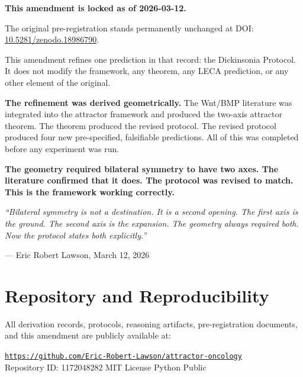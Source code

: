 \documentclass[12pt, a4paper]{article}
\theoremstyle{definition}
\theoremstyle{remark}
\begin{document}
\begin{center}
\colorbox{warnbox}{
\begin{minipage}{0.88\textwidth}
\vspace{0.6em}
\textbf{This amendment is locked as of 2026-03-12.}

\medskip
The original pre-registration stands permanently
unchanged at DOI:
\href{https://doi.org/10.5281/zenodo.18986790}
{10.5281/zenodo.18986790}.

\medskip
This amendment refines one prediction in that record:
the Dickinsonia Protocol. It does not modify the
framework, any theorem, any LECA prediction, or any
other element of the original.

\medskip
\textbf{The refinement was derived geometrically.}
The Wnt/BMP literature was integrated into the attractor
framework and produced the two-axis attractor theorem.
The theorem produced the revised protocol. The revised
protocol produced four new pre-specified, falsifiable
predictions. All of this was completed before any
experiment was run.

\medskip
\textbf{The geometry required bilateral symmetry to have
two axes. The literature confirmed that it does. The
protocol was revised to match. This is the framework
working correctly.}

\medskip
\textit{``Bilateral symmetry is not a destination. It is
a second opening. The first axis is the ground.
The second axis is the expansion.
The geometry always required both.
Now the protocol states both explicitly.''}

\vspace{0.4em}
\hfill --- Eric Robert Lawson, March 12, 2026
\vspace{0.4em}
\end{minipage}
}
\end{center}

\section*{Repository and Reproducibility}

All derivation records, protocols, reasoning artifacts,
pre-registration documents, and this amendment are
publicly available at:

\begin{center}
\href{https://github.com/Eric-Robert-Lawson/attractor-oncology}
{\texttt{https://github.com/Eric-Robert-Lawson/attractor-oncology}}
\\[0.3em]
\small Repository ID: 1172048282 \textbar{}
MIT License \textbar{} Python \textbar{} Public
\end{center}
\end{document}
